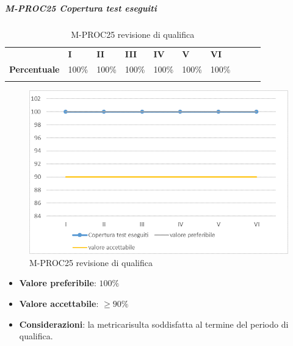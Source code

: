 \subparagraph{M-PROC25 Copertura test eseguiti} \mbox{}
\begin{longtable}[H!] {						
		>{}p{35mm}  		
		>{}p{12mm}
		>{}p{12mm}		
		>{}p{12mm}		
		>{}p{12mm}		
		>{}p{12mm}		
		>{}p{12mm}
		>{}p{12mm}
		>{}p{12mm}
		>{}p{12mm}
	}
	\rowcolor{gray!50}
	\textbf{} & \textbf{I} & \textbf{II} & \textbf{III} & \textbf{IV} & \textbf{V} & \textbf{VI} \TBstrut \\ [2mm]
	\textbf{Percentuale} & 100\% & 100\% & 100\% & 100\% & 100\% & 100\% \TBstrut \\ [2mm]
	\rowcolor{white}
	\caption{M-PROC25 revisione di qualifica}
\end{longtable}
\begin{figure}[H] 	
	\includegraphics[width=\linewidth]{./img/grafici/RQ25.png}	
	\caption{M-PROC25 revisione di qualifica}	
\end{figure}
\begin{itemize}
	\item \textbf{Valore preferibile}: $100\%$
	\item \textbf{Valore accettabile}: $\ge 90\%$
	\item \textbf{Considerazioni}: la metrica\glosp risulta soddisfatta al termine del periodo di qualifica.
\end{itemize}

